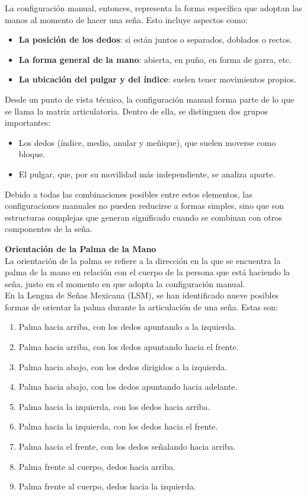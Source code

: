La configuración manual, entonces, representa la forma específica que adoptan las manos al momento de hacer una seña. Esto incluye aspectos como:

\begin{itemize}
    \item \textbf{La posición de los dedos}: si están juntos o separados, doblados o rectos.
    \item \textbf{La forma general de la mano}: abierta, en puño, en forma de garra, etc.
    \item \textbf{La ubicación del pulgar y del índice}: suelen tener movimientos propios.
\end{itemize}

Desde un punto de vista técnico, la configuración manual forma parte de lo que se llama la matriz articulatoria. Dentro de ella, se distinguen dos grupos importantes:

\begin{itemize}
    \item Los dedos (índice, medio, anular y meñique), que suelen moverse como bloque.
    \item El pulgar, que, por su movilidad más independiente, se analiza aparte.
\end{itemize}

Debido a todas las combinaciones posibles entre estos elementos, las configuraciones manuales no pueden reducirse a formas simples, sino que son estructuras complejas que generan significado cuando se combinan con otros componentes de la seña.

\newpage

\textbf{Orientación de la Palma de la Mano}\\
La orientación de la palma se refiere a la dirección en la que se encuentra la palma de la mano en relación con el cuerpo de la persona que está haciendo la seña, justo en el momento en que adopta la configuración manual.\\

En la Lengua de Señas Mexicana (LSM), se han identificado nueve posibles formas de orientar la palma durante la articulación de una seña. Estas son:

\begin{enumerate}
    \item Palma hacia arriba, con los dedos apuntando a la izquierda.
    \item Palma hacia arriba, con los dedos apuntando hacia el frente.
    \item Palma hacia abajo, con los dedos dirigidos a la izquierda.
    \item Palma hacia abajo, con los dedos apuntando hacia adelante.
    \item Palma hacia la izquierda, con los dedos hacia arriba.
    \item Palma hacia la izquierda, con los dedos hacia el frente.
    \item Palma hacia el frente, con los dedos señalando hacia arriba.
    \item Palma frente al cuerpo, dedos hacia arriba.
    \item Palma frente al cuerpo, dedos hacia la izquierda.
\end{enumerate}

